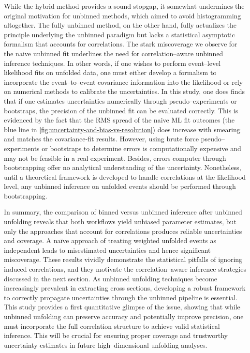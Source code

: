         While the hybrid method provides a sound stopgap, it somewhat undermines the original motivation for unbinned methods, which aimed to avoid histogramming altogether.
        The fully unbinned method, on the other hand, fully actualizes the principle underlying the unbinned paradigm but lacks a statistical asymptotic formalism that accounts for correlations.
        The stark miscoverage we observe for the naive unbinned fit underlines the need for correlation--aware unbinned inference techniques.
        In other words, if one wishes to perform event--level likelihood fits on unfolded data, one must either develop a formalism to incorporate the event--to--event covariance information into the likelihood or rely on numerical methods to calibrate the uncertainties.
        In this study, one does finds that if one estimates uncertainties numerically through pseudo--experiments or bootstraps, the precision of the unbinned fit can be evaluated correctly.
        This is evidenced by the fact that the RMS spread of the naive ML fit outcomes (the blue line in \cref{fig:uncertainty-and-bias-vs-resolution}) does increase with smearing and matches the covariance-fit results.
        However, using brute force pseudo--experiments or bootstraps to determine errors is computationally expensive and may not be feasible in a real experiment.
        Besides, errors computer through bootstrapping offer no analytical understanding of the uncertainty.
        Nonetheless, until a theoretical framework is developed to handle correlations at the likelihood level, any unbinned inference on unfolded events should be performed through bootstrapping.
    
        In summary, the comparison of binned versus unbinned inference after unbinned unfolding reveals that both workflows yield unbiased parameter estimates, but only the approaches that account for correlations produces reliable uncertainties and coverage.
        A na\"ive approach of treating weighted unfolded events as independent leads to misestimated uncertainties and hence significant miscoverage.
        These results vividly demonstrate the statistical pitfalls of ignoring induced correlations, and they motivate the correlation--aware inference strategies discussed in the next section.
        As unbinned unfolding techniques become increasingly prevalent in extracting cross sections, developing a robust framework to correctly propagate uncertainties through the unbinned pipeline is essential.
        This study provides a first quantitative glimpse of the issue, showing that while unbinned unfolding can preserve accuracy and potentially improve precision, one must incorporate the full correlation structure to achieve valid statistical inference.
        This will be crucial for ensuring proper coverage and trustworthy uncertainty estimates in future high--dimensional unfolding analyses.
